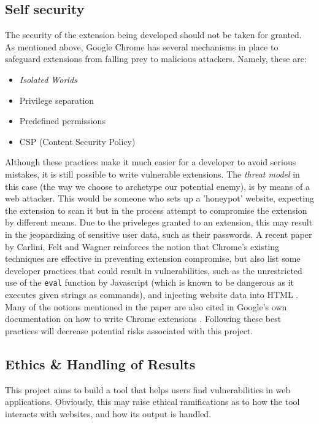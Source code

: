 \subsection{Self security}
 	The security of the extension being developed should not be taken for granted. As mentioned above, Google Chrome has several mechanisms in place to safeguard extensions from falling prey to malicious attackers. Namely, these are:
 	\begin{itemize}
 		\item \textit{Isolated Worlds}
 		\item Privilege separation
 		\item Predefined permissions
 		\item CSP (Content Security Policy)
 	\end{itemize} 
 	Although these practices make it much easier for a developer to avoid serious mistakes, it is still possible to write vulnerable extensions. The \textit{threat model} in this case (the way we choose to archetype our potential enemy), is by means of a web attacker. This would be someone who sets up a 'honeypot' website, expecting the extension to scan it but in the process attempt to compromise the extension by different means. Due to the priveleges granted to an extension, this may result in the jeopardizing of sensitive user data, such as their passwords. A recent paper by Carlini, Felt and Wagner reinforces the notion that Chrome's existing techniques are effective in preventing extension compromise, but also list some developer practices that could result in vulnerabilities, such as the unrestricted use of the \texttt{eval} function by Javascript (which is known to be dangerous as it executes given strings as commands), and injecting website data into HTML \cite{evalChromeExtensionSecurityArchitecture}. Many of the notions mentioned in the paper are also cited in Google's own documentation on how to write Chrome extensions \cite{chromeExtensionArchitecture}. Following these best practices will decrease potential risks associated with this project. \\ 

\subsection{Ethics \& Handling of Results}
\label{ethics}
This project aims to build a tool that helps users find vulnerabilities in web applications. Obviously, this may raise ethical ramifications as to how the tool interacts with websites, and how its output is handled. \\

